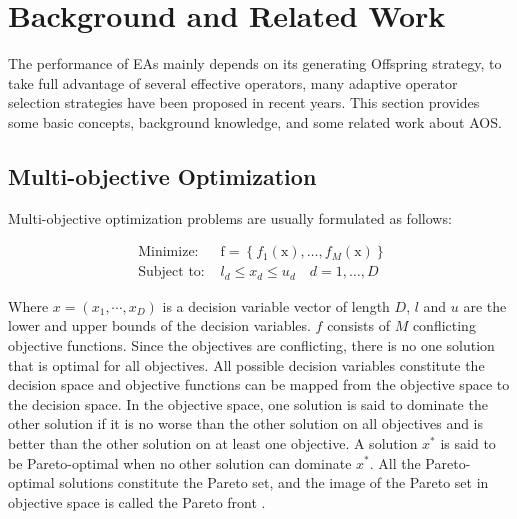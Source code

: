 \documentclass[journal]{IEEEtran}
\begin{document}
\IEEEpubidadjcol

\section{Background and Related Work}
The performance of EAs mainly depends on its generating Offspring strategy, to take full advantage of several effective operators, many adaptive operator selection strategies have been proposed in recent years.
This section provides some basic concepts, background knowledge, and some related work about AOS.

\subsection{Multi-objective Optimization}
Multi-objective optimization problems are usually formulated as follows:

\begin{equation}
    \begin{array}{ll}
        \text { Minimize: }   & \mathrm{f}=\left\{f_{1}(\mathrm{x}), \ldots, f_{M}(\mathrm{x})\right\} \\
        \text { Subject to: } & l_{d} \leq x_{d} \leq u_{d} \quad d=1, \ldots, D
    \end{array}
    \label{eq: moea}
\end{equation}

Where $x = (x_1, \cdots ,x_D)$ is a decision variable vector of length $D$, $l$ and $u$ are the lower and upper bounds of the decision variables. $f$ consists of $M$ conflicting objective functions. Since the objectives are conflicting, there is no one solution that is optimal for all objectives.
All possible decision variables constitute the decision space and objective functions can be mapped from the objective space to the decision space\cite{gonccalves2017adaptive}. In the objective space, one solution is said to dominate the other solution if it is no worse than the other solution on all objectives and is better than the other solution on at least one objective.
A solution $x^*$ is said to be Pareto-optimal when no other solution can dominate $x^*$. All the Pareto-optimal solutions constitute the Pareto set, and the image of the Pareto set in objective space is called the Pareto front \cite{deb2001multi}.
\end{document}
